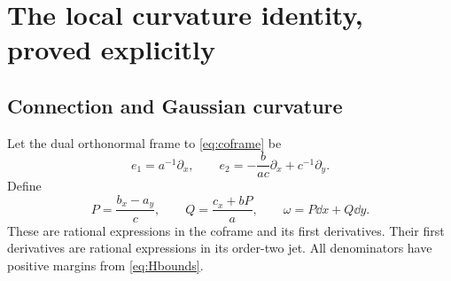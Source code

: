 \section{The local curvature identity, proved explicitly}\label{sec:local}

\subsection{Connection and Gaussian curvature}

Let the dual orthonormal frame to \eqref{eq:coframe} be
\[
e_1=a^{-1}\partial_x,\qquad
e_2=-\frac{b}{ac}\partial_x+c^{-1}\partial_y.
\]
Define
\begin{equation}\label{eq:PQ}
P=\frac{b_x-a_y}{c},\qquad
Q=\frac{c_x+bP}{a},\qquad
\omega=P\dd x+Q\dd y.
\end{equation}
These are rational expressions in the coframe and its first derivatives. Their first derivatives are rational expressions in its order-two jet. All denominators have positive margins from \eqref{eq:Hbounds}.


